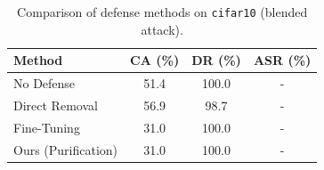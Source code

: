 \begin{table}[htbp]
\centering
\caption{Comparison of defense methods on \texttt{cifar10} (blended attack).}
\label{tab:results}
\begin{tabular}{lccc}
\toprule
Method & CA (\%) & DR (\%) & ASR (\%) \\
\midrule
  No Defense & 51.4 & 100.0 & - \\
  Direct Removal & 56.9 & 98.7 & - \\
  Fine-Tuning & 31.0 & 100.0 & - \\
  Ours (Purification) & 31.0 & 100.0 & - \\
\bottomrule
\end{tabular}
\end{table}